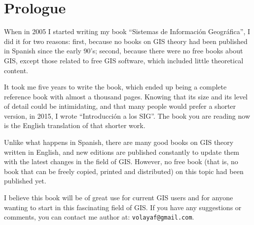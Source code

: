 \chapter*{Prologue}

\vspace{-1cm}

When in 2005 I started writing my book ``Sistemas de Informaci\'{o}n Geogr\'{a}fica'', I did it for two reasons: first, because no books on GIS theory had been published in Spanish since the early 90's; second, because there were no free books about GIS, except those related to free GIS software, which included little theoretical content.

It took me five years to write the book, which ended up being a complete reference book with almost a thousand pages. Knowing that its size and its level of detail could be intimidating, and that many people would prefer a shorter version, in 2015, I wrote ``Introducci\'{o}n a los SIG''. The book you are reading now is the English translation of that shorter work.

Unlike what happens in Spanish, there are many good books on GIS theory written in English, and new editions are published constantly to update them with the latest changes in the field of GIS. However, no free book (that is, no book that can be freely copied, printed and distributed) on this topic had been published yet. 

I believe this book will be of great use for current GIS users and for anyone wanting to start in this fascinating field of GIS. If you have any suggestions or comments, you can contact me author at: \texttt{volayaf@gmail.com}.